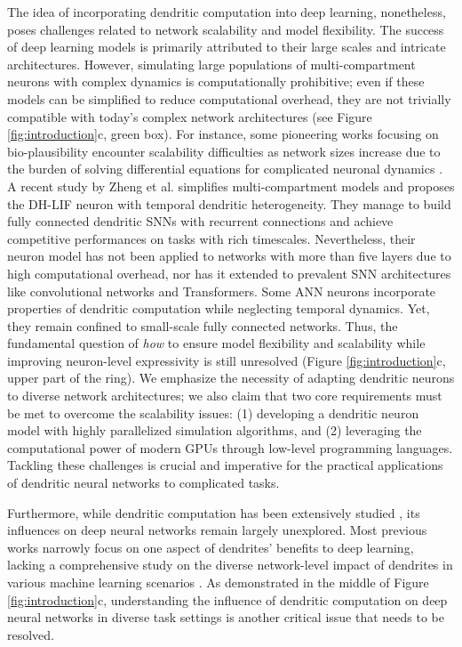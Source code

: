 The idea of incorporating dendritic computation into deep learning, nonetheless, poses challenges related to network scalability and model flexibility. The success of deep learning models is primarily attributed to their large scales and intricate architectures. However, simulating large populations of multi-compartment neurons with complex dynamics is computationally prohibitive; even if these models can be simplified to reduce computational overhead, they are not trivially compatible with today's complex network architectures (see Figure \ref{fig:introduction}c, green box). For instance, some pioneering works focusing on bio-plausibility encounter scalability difficulties as network sizes increase due to the burden of solving differential equations for complicated neuronal dynamics \cite{guerguiev2017towards,sacramento2018microcircuits,payeur2021burst}. A recent study by Zheng et al. \cite{zheng2024temporal} simplifies multi-compartment models and proposes the DH-LIF neuron with temporal dendritic heterogeneity. They manage to build fully connected dendritic SNNs with recurrent connections and achieve competitive performances on tasks with rich timescales. Nevertheless, their neuron model has not been applied to networks with more than five layers due to high computational overhead, nor has it extended to prevalent SNN architectures like convolutional networks and Transformers. Some ANN neurons incorporate properties of dendritic computation \cite{wu2018improved,iyer2022catastrophe,georgescu2023apical} while neglecting temporal dynamics. Yet, they remain confined to small-scale fully connected networks. Thus, the fundamental question of \textit{how} to ensure model flexibility and scalability while improving neuron-level expressivity is still unresolved (Figure \ref{fig:introduction}c, upper part of the ring). We emphasize the necessity of adapting dendritic neurons to diverse network architectures; we also claim that two core requirements must be met to overcome the scalability issues: (1) developing a dendritic neuron model with highly parallelized simulation algorithms, and (2) leveraging the computational power of modern GPUs through low-level programming languages. Tackling these challenges is crucial and imperative for the practical applications of dendritic neural networks to complicated tasks.

Furthermore, while dendritic computation has been extensively studied \cite{london2005dendritic,hay2011pyramidal,payeur2019dendriticinfo,li2019dendritic,bicknell2021synaptic}, its influences on deep neural networks remain largely unexplored. Most previous works narrowly focus on one aspect of dendrites' benefits to deep learning, lacking a comprehensive study on the diverse network-level impact of dendrites in various machine learning scenarios \cite{guerguiev2017towards,payeur2021burst,wu2018improved,georgescu2023apical,zheng2024temporal}. As demonstrated in the middle of Figure \ref{fig:introduction}c, understanding the influence of dendritic computation on deep neural networks in diverse task settings is another critical issue that needs to be resolved.

